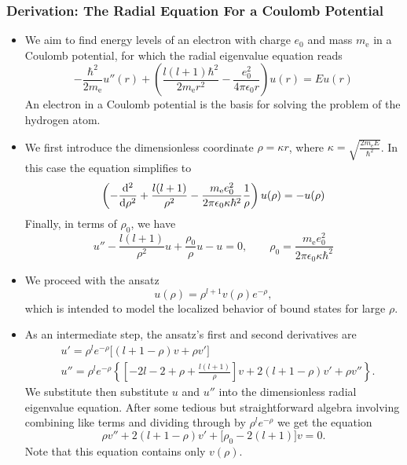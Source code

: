 \documentclass[11pt, a4paper]{article}
\begin{document}
\subsubsection{Derivation: The Radial Equation For a Coulomb Potential}
\begin{itemize}
	\item We aim to find energy levels of an electron with charge $ e_{0} $ and mass $ m_{\text{e}} $ in a Coulomb potential, for which the radial eigenvalue equation reads
	\begin{equation*}
		-\frac{\hbar^{2}}{2m_{\text{e}}}u''(r) + \left(\frac{l (l+1)\hbar^{2}}{2m_{\text{e}}r^{2}} - \frac{e_{0}^{2}}{4\pi \epsilon_{0}r}\right)u(r) = Eu(r)
	\end{equation*}
	An electron in a Coulomb potential is the basis for solving the problem of the hydrogen atom.
	
	\item We first introduce the dimensionless coordinate $ \rho = \kappa r $, where $ \kappa = \sqrt{\frac{2m_{\text{e}}E}{\hbar^{2}}} $. In this case the equation simplifies to 
	\begin{equation*}
		\left(-\dv[2]{}{\rho} + \frac{l (l+1)}{\rho^{2}} - \frac{m_{\text{e}}e_{0}^{2}}{2\pi \epsilon_{0} \kappa \hbar^{2}}\frac{1}{\rho}\right)u(\rho) = - u(\rho)
	\end{equation*}
	Finally, in terms of $ \rho_{0} $, we have
	\begin{equation*}
		u'' - \frac{l \left(l+1\right)}{\rho^{2}}u + \frac{\rho_{0}}{\rho}u - u = 0, \qquad \rho_{0} = \frac{m_{\text{e}}e_{0}^{2}}{2\pi \epsilon_{0}\kappa \hbar^{2}}
	\end{equation*}
	
	\item We proceed with the ansatz
	\begin{equation*}
		u(\rho) = \rho^{l + 1}v(\rho)e^{-\rho},
	\end{equation*}
	which is intended to model the localized behavior of bound states for large $ \rho $. 
	
	\item As an intermediate step, the ansatz's first and second derivatives are
	\begin{align*}
		& u' = \rho^{l}e^{-\rho} \big[(l+1-\rho)v + \rho v'\big]\\
		& u'' = \rho^{l}e^{-\rho}\left\{\left[-2l -2 + \rho + \frac{l (l+1)}{\rho}\right]v + 2(l + 1 - \rho)v' + \rho v''\right\}.
	\end{align*}
	We substitute then substitute $ u $ and $ u'' $ into the dimensionless radial eigenvalue equation. After some tedious but straightforward algebra involving combining like terms and dividing through by $ \rho^{l}e^{-\rho} $ we get the equation
	\begin{equation*}
		\rho v'' + 2(l + 1 - \rho)v' + \big[\rho_{0} - 2(l+1)\big]v = 0.
	\end{equation*}
	Note that this equation contains only $ v(\rho) $. 
	
\end{itemize}
\end{document}
